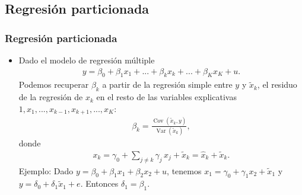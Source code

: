 \documentclass[t, compress, spanish, aspectratio=169]{beamer}
\DeclareMathOperator{\Var}{Var}
\DeclareMathOperator{\Cov}{Cov}
\begin{document}
    \subsection{Regresi\'on particionada}
    \begin{frame}
        \frametitle{Regresi\'on particionada}
        \begin{itemize}
            \item <1-> Dado el modelo de regresi\'on m\'ultiple
            \begin{align*}
            y = \beta_0+\beta_1x_{1}+...+\beta_k x_{k} +...+\beta_K x_{K}+ u.
            \end{align*}
            Podemos recuperar $\beta_k$ a partir de la regresi\'on simple entre $y$ y $\tilde x_{k}$, el residuo de la regresi\'on de $x_{k}$ en el resto de las variables explicativas $1,x_1,...,x_{k-1},x_{k+1},...,x_K$:
            \begin{align*}
            \beta_{k} = \frac{\Cov(\tilde x_{k},y)}{\Var(\tilde x_{k})},
            \end{align*}
            donde
            \begin{align*}
            x_{k} = \gamma_0+\sum_{j\neq k} \gamma_j \, x_{j}+\tilde x_{k} =\hat x_{k}+\tilde x_{k}.
            \end{align*}
            Ejemplo: Dado $y=\beta_0+\beta_1 x_1+\beta_2 x_2+u$, tenemos $x_1=\gamma_0+\gamma_1x_2+\tilde x_1$ y $y=\delta_0+\delta_1 \tilde x_1+e$. Entonces $\delta_1=\beta_1$.
        \end{itemize}
    \end{frame}
\end{document}
